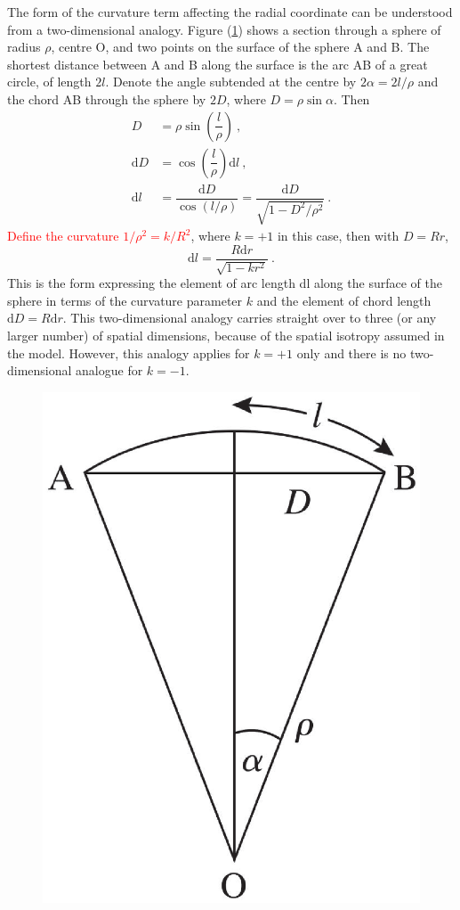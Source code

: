 \documentclass[12pt,a4paper]{article}
\newcommand{\dif}{\mathrm{d}}
\begin{document}
The form of the curvature term affecting the radial coordinate can be understood from a two-dimensional analogy. Figure (\ref{fig:2D_analogy}) shows a section through a sphere of radius $\rho$, centre O, and two points on the surface of the sphere A and B. The shortest distance between A and B along the surface is the arc AB of a great circle, of length $2l$. Denote the angle subtended at the centre by $2\alpha = 2l/\rho$ and the chord AB through the sphere by $2D$, where $D = \rho \sin \alpha$. Then
\begin{align*}
D &= \rho \sin \left(\dfrac{l}{\rho}  \right) ~, \\
\dif D &= \cos \left(\dfrac{l}{\rho}  \right) \dif l ~, \\
\dif l &= \dfrac{\dif D}{\cos (l/\rho)} = \dfrac{\dif D}{\sqrt{1-D^2/\rho^2}} ~.
\end{align*}
\textcolor{red}{Define the curvature $1/\rho^2 = k/R^2$}, where $k = +1$ in this case, then with $D = Rr$,
\begin{equation}
\dif l = \dfrac{R\dif r}{\sqrt{1 -k r^2} } ~.
\end{equation}
This is the form expressing the element of arc length dl along the surface of the sphere in terms of the curvature parameter $k$ and the element of chord length $\dif D = R \dif r$. This two-dimensional analogy carries straight
over to three (or any larger number) of spatial dimensions, because of the spatial isotropy assumed in the model. However, this analogy applies for $k = +1$ only and there is no two-dimensional analogue for $k = -1$.


\begin{figure}
\centering
\includegraphics[height=6.cm,angle=0]{2D_analogy.eps}
\caption{} 
\label{fig:2D_analogy}
\end{figure}
\end{document}
